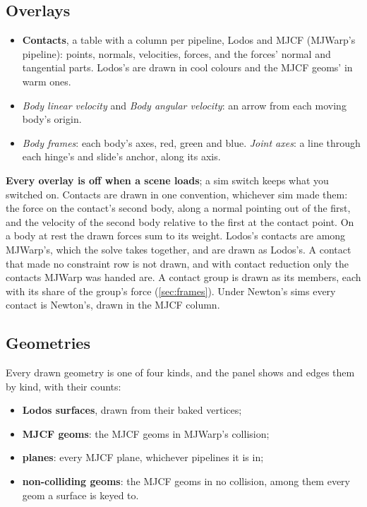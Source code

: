 \subsection{Overlays}\label{sec:overlays}

\begin{itemize}
\item \textbf{Contacts}, a table with a column per pipeline, Lodos and MJCF (MJWarp's pipeline): points, normals, velocities, forces, and the forces' normal and tangential parts. Lodos's are drawn in cool colours and the MJCF geoms' in warm ones.
\item \emph{Body linear velocity} and \emph{Body angular velocity}: an arrow from each moving body's origin.
\item \emph{Body frames}: each body's axes, red, green and blue. \emph{Joint axes}: a line through each hinge's and slide's anchor, along its axis.
\end{itemize}

\textbf{Every overlay is off when a scene loads}; a sim switch keeps what you switched on. Contacts are drawn in one convention, whichever sim made them: the force on the contact's second body, along a normal pointing out of the first, and the velocity of the second body relative to the first at the contact point. On a body at rest the drawn forces sum to its weight. Lodos's contacts are among MJWarp's, which the solve takes together, and are drawn as Lodos's. A contact that made no constraint row is not drawn, and with contact reduction only the contacts MJWarp was handed are. A contact group is drawn as its members, each with its share of the group's force (\cref{sec:frames}). Under Newton's sims every contact is Newton's, drawn in the MJCF column.

\subsection{Geometries}\label{sec:geometries}

Every drawn geometry is one of four kinds, and the panel shows and edges them by kind, with their counts:

\begin{itemize}
\item \textbf{Lodos surfaces}, drawn from their baked vertices;
\item \textbf{MJCF geoms}: the MJCF geoms in MJWarp's collision;
\item \textbf{planes}: every MJCF plane, whichever pipelines it is in;
\item \textbf{non-colliding geoms}: the MJCF geoms in no collision, among them every geom a surface is keyed to.
\end{itemize}

